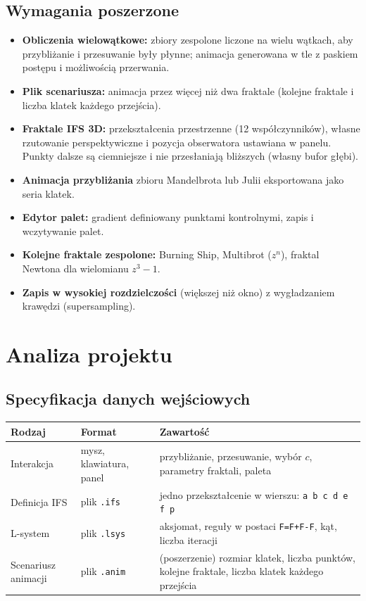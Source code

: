 \documentclass[11pt,a4paper]{article}
\newcommand{\kod}[1]{\texttt{#1}}
\begin{document}
\subsection{Wymagania poszerzone}

\begin{itemize}
  \item \textbf{Obliczenia wielowątkowe:} zbiory zespolone liczone na wielu
        wątkach, aby przybliżanie i przesuwanie były płynne; animacja
        generowana w tle z paskiem postępu i możliwością przerwania.
  \item \textbf{Plik scenariusza:} animacja przez więcej niż dwa fraktale
        (kolejne fraktale i liczba klatek każdego przejścia).
  \item \textbf{Fraktale IFS 3D:} przekształcenia przestrzenne (12
        współczynników), własne rzutowanie perspektywiczne i pozycja
        obserwatora ustawiana w panelu. Punkty dalsze są ciemniejsze i nie
        przesłaniają bliższych (własny bufor głębi).
  \item \textbf{Animacja przybliżania} zbioru Mandelbrota lub Julii
        eksportowana jako seria klatek.
  \item \textbf{Edytor palet:} gradient definiowany punktami kontrolnymi, zapis
        i wczytywanie palet.
  \item \textbf{Kolejne fraktale zespolone:} Burning Ship, Multibrot ($z^n$),
        fraktal Newtona dla wielomianu $z^3 - 1$.
  \item \textbf{Zapis w wysokiej rozdzielczości} (większej niż okno)
        z wygładzaniem krawędzi (supersampling).
\end{itemize}

\section{Analiza projektu}

\subsection{Specyfikacja danych wejściowych}

\begin{center}
\begin{tabularx}{\textwidth}{@{}l l X@{}}
  \toprule
  Rodzaj & Format & Zawartość \\
  \midrule
  Interakcja & mysz, klawiatura, panel &
    przybliżanie, przesuwanie, wybór $c$, parametry fraktali, paleta \\
  Definicja IFS & plik \kod{.ifs} &
    jedno przekształcenie w wierszu: \kod{a b c d e f p} \\
  L-system & plik \kod{.lsys} &
    aksjomat, reguły w postaci \kod{F=F+F-F}, kąt, liczba iteracji \\
  Scenariusz animacji & plik \kod{.anim} &
    (poszerzenie) rozmiar klatek, liczba punktów, kolejne fraktale, liczba
    klatek każdego przejścia \\
  \bottomrule
\end{tabularx}
\end{center}
\end{document}
